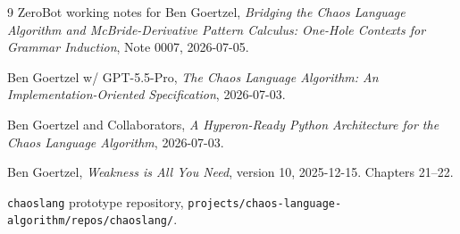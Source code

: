 \documentclass[11pt]{article}
\begin{document}
\begin{thebibliography}{9}
ZeroBot working notes for Ben Goertzel,
\emph{Bridging the Chaos Language Algorithm and McBride-Derivative Pattern Calculus: One-Hole Contexts for Grammar Induction},
Note 0007, 2026-07-05.

Ben Goertzel w/ GPT-5.5-Pro,
\emph{The Chaos Language Algorithm: An Implementation-Oriented Specification},
2026-07-03.

Ben Goertzel and Collaborators,
\emph{A Hyperon-Ready Python Architecture for the Chaos Language Algorithm},
2026-07-03.

Ben Goertzel,
\emph{Weakness is All You Need},
version 10, 2025-12-15.  Chapters 21--22.

\texttt{chaoslang} prototype repository,
\texttt{projects/chaos-language-algorithm/repos/chaoslang/}.
\end{thebibliography}
\end{document}
